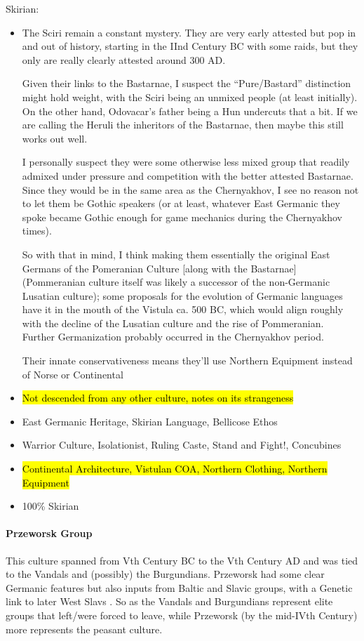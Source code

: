 \documentclass{article}
\begin{document}
	Skirian:
	\begin{itemize}
		\item The Sciri remain a constant mystery. They are very early attested but pop in and out of history, starting in the IInd Century BC with some raids, but they only are really clearly attested around 300 AD. 
		
		Given their links to the Bastarnae, I suspect the “Pure/Bastard” distinction might hold weight, with the Sciri being an unmixed people (at least initially). On the other hand, Odovacar’s father being a Hun undercuts that a bit.
		If we are calling the Heruli the inheritors of the Bastarnae, then maybe this still works out well.
		
		I personally suspect they were some otherwise less mixed group that readily admixed under pressure and competition with the better attested Bastarnae.
		Since they would be in the same area as the Chernyakhov, I see no reason not to let them be Gothic speakers (or at least, whatever East Germanic they spoke became Gothic enough for game mechanics during the Chernyakhov times).
		
		So with that in mind, I think making them essentially the original East Germans of the Pomeranian Culture [along with the Bastarnae] (Pommeranian culture itself was likely a successor of the non-Germanic Lusatian culture); some proposals for the evolution of Germanic languages have it in the mouth of the Vistula ca. 500 BC, which would align roughly with the decline of the Lusatian culture and the rise of Pommeranian.
		Further Germanization probably occurred in the Chernyakhov period.
		
		Their innate conservativeness means they’ll use Northern Equipment instead of Norse or Continental
		\item \hl{Not descended from any other culture, notes on its strangeness}
		\item East Germanic Heritage, Skirian Language, Bellicose Ethos
		\item Warrior Culture, Isolationist, Ruling Caste, Stand and Fight!, Concubines
		\item \hl{Continental Architecture, Vistulan COA, Northern Clothing, Northern Equipment}
		\item 100\% Skirian
	\end{itemize}
	
	\paragraph{Przeworsk Group}
	This culture spanned from Vth Century BC to the Vth Century AD and was tied to the Vandals and (possibly) the Burgundians.
	Przeworsk had some clear Germanic features but also inputs from Baltic and Slavic groups, with a Genetic link to later West Slavs \cite{SlavGenomes}.
	So as the Vandals and Burgundians represent elite groups that left/were forced to leave, while Przeworsk (by the mid-IVth Century) more represents the peasant culture.
	
\end{document}
